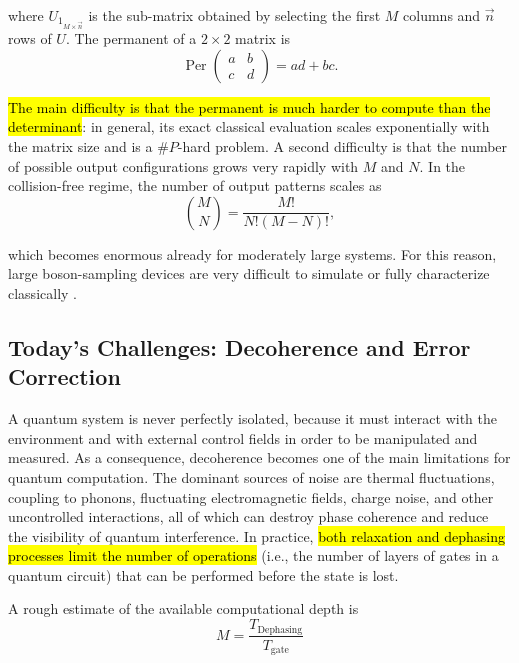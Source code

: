 where $U_{1_{M\times\vec{n}}}$ is the sub-matrix obtained by selecting the first $M$ columns and $\vec{n}$ rows of $U$. The permanent of a $2\times 2$ matrix is
\begin{equation}
\operatorname{Per}\begin{pmatrix}
a & b\\
c & d
\end{pmatrix}=ad+bc.
\end{equation}

\hl{The main difficulty is that the permanent is much harder to compute than the determinant}: in general, its exact classical evaluation scales exponentially with the matrix size and is a $\#P$-hard problem. A second difficulty is that the number of possible output configurations grows very rapidly with $M$ and $N$. In the collision-free regime, the number of output patterns scales as
\begin{equation}\label{eqn:17-binomial-coefficient}
\binom{M}{N}=\frac{M!}{N!(M-N)!},
\end{equation}

which becomes enormous already for moderately large systems. For this reason, large boson-sampling devices are very difficult to simulate or fully characterize classically \cite{art:Zhong-2020-quantum-advantage}.

\subsection{Today's Challenges: Decoherence and Error Correction}

A quantum system is never perfectly isolated, because it must interact with the environment and with external control fields in order to be manipulated and measured. As a consequence, decoherence becomes one of the main limitations for quantum computation. The dominant sources of noise are thermal fluctuations, coupling to phonons, fluctuating electromagnetic fields, charge noise, and other uncontrolled interactions, all of which can destroy phase coherence and reduce the visibility of quantum interference. In practice, \hl{both relaxation and dephasing processes limit the number of operations} (i.e., the number of layers of gates in a quantum circuit) that can be performed before the state is lost. 

A rough estimate of the available computational depth is
\begin{equation}\label{eqn:17-computational-depth}
M = \frac{T_{\text{Dephasing}}}{T_{\text{gate}}}
\end{equation}

